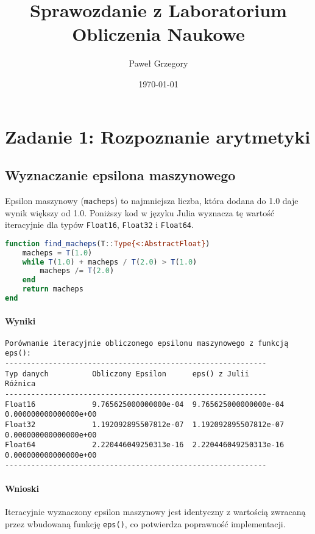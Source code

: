 \documentclass[a4paper,12pt]{article}
\title{Sprawozdanie z Laboratorium\\Obliczenia Naukowe}
\author{Paweł Grzegory}
\date{\today}
\begin{document}
\maketitle

\section{Zadanie 1: Rozpoznanie arytmetyki}

\subsection{ Wyznaczanie epsilona maszynowego}

Epsilon maszynowy (\texttt{macheps}) to najmniejsza liczba, która dodana do 1.0 daje wynik większy od 1.0. Poniższy kod w języku Julia wyznacza tę wartość iteracyjnie dla typów \texttt{Float16}, \texttt{Float32} i \texttt{Float64}.

\begin{lstlisting}[language=Julia]
function find_macheps(T::Type{<:AbstractFloat})
    macheps = T(1.0)
    while T(1.0) + macheps / T(2.0) > T(1.0)
        macheps /= T(2.0)
    end
    return macheps
end
\end{lstlisting}

\paragraph{Wyniki}
\begin{verbatim}
Porównanie iteracyjnie obliczonego epsilonu maszynowego z funkcją eps():
------------------------------------------------------------
Typ danych          Obliczony Epsilon      eps() z Julii          Różnica
------------------------------------------------------------
Float16             9.765625000000000e-04  9.765625000000000e-04  0.000000000000000e+00
Float32             1.192092895507812e-07  1.192092895507812e-07  0.000000000000000e+00
Float64             2.220446049250313e-16  2.220446049250313e-16  0.000000000000000e+00
------------------------------------------------------------
\end{verbatim}

\paragraph{Wnioski}
Iteracyjnie wyznaczony epsilon maszynowy jest identyczny z wartością zwracaną przez wbudowaną funkcję \texttt{eps()}, co potwierdza poprawność implementacji.
\end{document}

